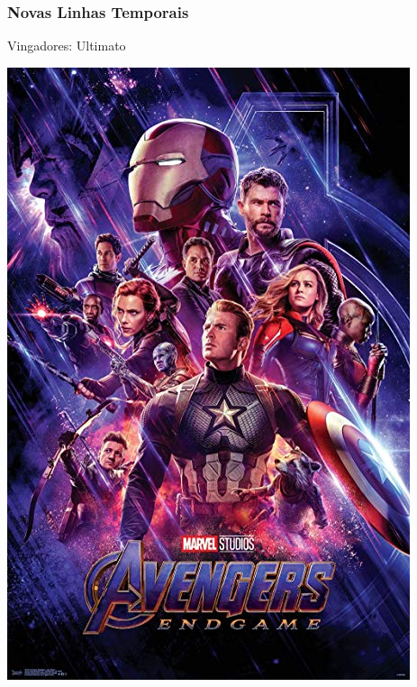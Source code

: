 \begin{frame}
    \frametitle{Novas Linhas Temporais}
    
    \alert{Vingadores: Ultimato}

    \includegraphics[height=0.8\textheight]{img/posters/avengers_endgame.jpg}
\end{frame}

